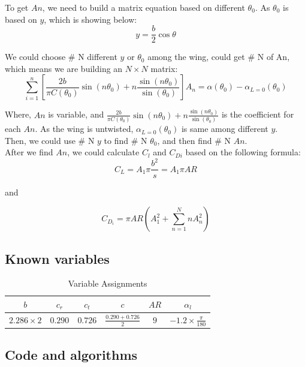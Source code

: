 \documentclass[12pt]{article}
\begin{document}
To get $An$, we need to build a matrix equation based on different $\theta_0$. As $\theta_0$ is based on $y$, which is showing below:
$$
y = \frac{b}{2} \cos \theta
$$

We could choose \# N different $y$ or $\theta_0$ among the wing, could get \# N of An, which means we are building an $N \times N$ matrix:
$$
\sum_{i=1}^{n} \left[ \frac{2b}{\pi C(\theta_0)} \sin(n \theta_0) + n \frac{\sin(n \theta_0)}{\sin(\theta_0)} \right] A_n = \alpha(\theta_0) - \alpha_{L=0}(\theta_0)
$$

Where, $An$ is variable, and $ \frac{2b}{\pi C(\theta_0)} \sin(n \theta_0) + n \frac{\sin(n \theta_0)}{\sin(\theta_0)}$ is the coefficient for each $An$. As the wing is untwisted, $\alpha_{L=0}(\theta_0)$ is same among different $y$.\\

Then, we could use \# N $y$ to find \# N $\theta_0$, and then find \# N $An$.\\



After we find $An$, we could calculate $C_l$ and $C_{Di}$ based on the following formula:
$$
C_L = A_1 \pi \frac{b^2}{s} = A_1 \pi AR
$$

and 

$$
C_{D_i} = \pi AR \left( A_1^2 +  \sum_{n=1}^{N} n A_n^2 \right)
$$

\subsection{Known variables}

\begin{table}[ht]
\centering
\begin{tabular}{cccccc}
\toprule
\( b \) & \( c_r \) & \( c_t \) & \( c \) & \( AR \) & \( \alpha_l \) \\
\midrule
\( 2.286 \times 2 \) & \( 0.290 \) & \( 0.726 \) & \( \frac{0.290 + 0.726}{2} \) & \( 9 \) & \( -1.2 \times \frac{\pi}{180} \) \\
\bottomrule
\end{tabular}
\caption{Variable Assignments}
\label{tab:variables}
\end{table}



\subsection{Code and algorithms}
\end{document}
